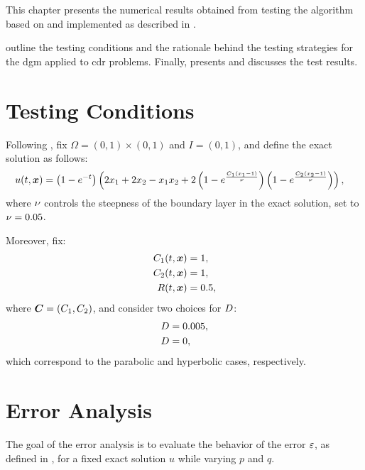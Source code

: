 This chapter presents the numerical results obtained from testing the algorithm based on  and implemented as described in .

 outline the testing conditions and the rationale behind the testing strategies for the \acrshort{dgm} applied to \acrshort{cdr} problems. Finally,  presents and discusses the test results.

\section{Testing Conditions} \label{sec:tests}

Following \cite{Feistauer2007}, fix $\Omega = \left( 0, 1 \right) \times \left( 0, 1 \right)$ and $I = \left( 0, 1 \right)$, and define the exact solution as follows:
\begin{align}
    u(t, \bm{x}) &= \left( 1 - e^{-t} \right) \left( 2 x_1 + 2 x_2 - x_1 x_2 + 2 \left( 1 - e^{\frac{C_1 \left( x_1 - 1 \right) }{\nu}} \right) \left( 1 - e^{\frac{C_2 \left( x_2 - 1 \right) }{\nu}} \right) \right), \label{eq:u_test_exact}
\end{align}
where $\nu$ controls the steepness of the boundary layer in the exact solution, set to $\nu = 0.05$.

Moreover, fix:
\begin{align}
    C_1(t, \bm{x}) &= 1, \\
    C_2(t, \bm{x}) &= 1, \\
    R(t, \bm{x}) &= 0.5,
\end{align}
where $\bm{C} = \left( C_1, C_2 \right)$, and consider two choices for $D$:
\begin{align}
    D &= 0.005, \\
    D &= 0,
\end{align}
which correspond to the parabolic and hyperbolic cases, respectively.

\newpage
\section{Error Analysis} \label{section:error_results}

The goal of the error analysis is to evaluate the behavior of the error $\varepsilon$, as defined in , for a fixed exact solution $u$ while varying $p$ and $q$.

